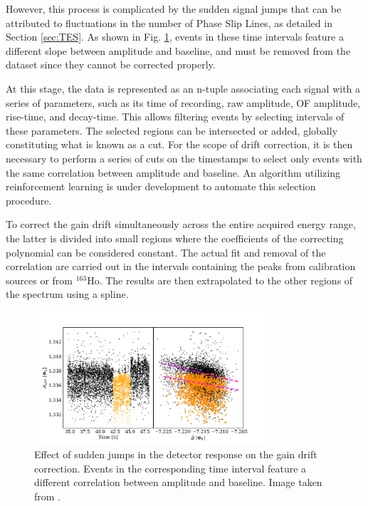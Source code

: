 However, this process is complicated by the sudden signal jumps that can be attributed to fluctuations in the number of
Phase Slip Lines, as detailed in Section \ref{sec:TES}. As shown in Fig. \ref{fig:drift}, events in these time
intervals feature a different slope between amplitude and baseline, and must be removed from the dataset since they
cannot be corrected properly. 

At this stage, the data is represented as an n-tuple associating each signal with a series
of parameters, such as its time of recording, raw amplitude, OF amplitude, rise-time, and decay-time. This allows
filtering events by selecting intervals of these parameters. The selected regions can be intersected or added, globally
constituting what is known as a cut. For the scope of drift correction, it is then necessary to perform a series of cuts
on the timestamps to select only events with the same correlation between amplitude and baseline. An algorithm utilizing
reinforcement learning is under development to automate this selection procedure.

To correct the gain drift simultaneously across the entire acquired energy range, the latter is divided into small regions where the coefficients of the correcting polynomial can be considered constant. The actual fit and removal of the correlation are carried out in the intervals containing the peaks from calibration sources or from $^{163}$Ho. The results are then extrapolated to the other regions of the spectrum using a spline.

\begin{figure}[t]
  \centering
  \includegraphics[width=0.77\textwidth]{figures/ch3/drift.pdf}
  \caption{Effect of sudden jumps in the detector response on the gain drift correction. Events in the corresponding
  time interval feature a different correlation between amplitude and baseline. Image taken from
\cite{borghesi2022toward}.}
  \label{fig:drift}
\end{figure}


